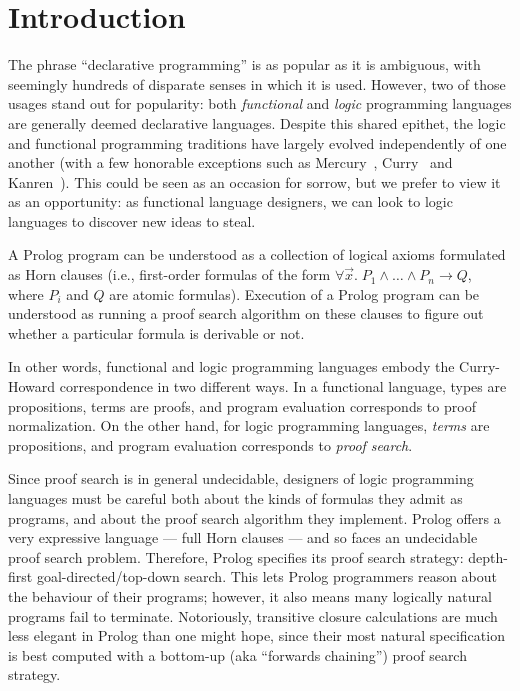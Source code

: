 \section{Introduction}

The phrase ``declarative programming'' is as popular as it is ambiguous, with
seemingly hundreds of disparate senses in which it is used. However, two of
those usages stand out for popularity: both \emph{functional} and \emph{logic}
programming languages are generally deemed declarative languages. Despite this
shared epithet, the logic and functional programming traditions have largely
evolved independently of one another (with a few honorable exceptions such as
Mercury~\cite{mercury}, Curry~\cite{curry} and Kanren~\cite{kanren}). This could
be seen as an occasion for sorrow, but we prefer to view it as an opportunity:
as functional language designers, we can look to logic languages to discover new
ideas to steal.

A Prolog program can be understood as a collection of logical axioms formulated
as Horn clauses (i.e., first-order formulas of the form $\forall \vec{x}.\;P_1
\land \ldots \land P_n \to Q$, where $P_i$ and $Q$ are atomic formulas).
Execution of a Prolog program can be understood as running a proof search
algorithm on these clauses to figure out whether a particular formula is
derivable or not.

In other words, functional and logic programming languages embody the
Curry-Howard correspondence in two different ways. In a functional language,
types are propositions, terms are proofs, and program evaluation corresponds to
proof normalization. On the other hand, for logic programming languages,
\emph{terms} are propositions, and program evaluation corresponds to \emph{proof
  search}.

Since proof search is in general undecidable, designers of logic programming
languages must be careful both about the kinds of formulas they admit as
programs, and about the proof search algorithm they implement. Prolog offers a
very expressive language --- full Horn clauses --- and so faces an undecidable
proof search problem. Therefore, Prolog specifies its proof search strategy:
depth-first goal-directed/top-down search. This lets Prolog programmers reason
about the behaviour of their programs; however, it also means many logically
natural programs fail to terminate. Notoriously, transitive closure calculations
are much less elegant in Prolog than one might hope, since their most natural
specification is best computed with a bottom-up (aka ``forwards chaining'')
proof search strategy.

